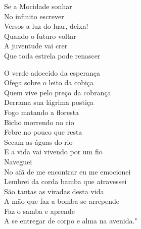 Se a Mocidade sonhar \\
No infinito escrever \\
Versos a luz do luar, deixa! \\
Quando o futuro voltar \\
A juventude vai crer \\
Que toda estrela pode renascer

O verde adoecido da esperança \\
Ofega sobre o leito da cobiça \\
Quem vive pelo preço da cobrança \\
Derrama sua lágrima postiça \\
Fogo matando a floresta \\
Bicho morrendo no cio \\
Febre no pouco que resta \\
Secam as águas do rio \\
E a vida vai vivendo por um fio \\
Naveguei \\
No afã de me encontrar eu me emocionei \\
Lembrei da corda bamba que atravessei \\
São tantas as viradas desta vida \\
A mão que faz a bomba se arrepende \\
Faz o samba e aprende \\
A se entregar de corpo e alma na avenida."